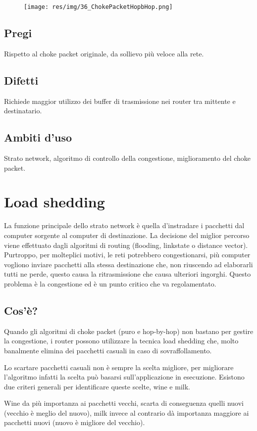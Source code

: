 \begin{figure}[H]
\centering
\texttt{[image: res/img/36\_ChokePacketHopbHop.png]}
\end{figure}
 
\subsection{Pregi}
Rispetto al choke packet originale, da sollievo più veloce alla rete.
\subsection{Difetti}
Richiede maggior utilizzo dei buffer di trasmissione nei router tra mittente e destinatario.
\subsection{Ambiti d'uso}
Strato network, algoritmo di controllo della congestione, miglioramento del choke packet.

\section{Load shedding}
La funzione principale dello strato network è quella d'instradare i pacchetti dal computer sorgente al computer di destinazione. La decisione del miglior percorso viene effettuato dagli algoritmi di routing (flooding, linkstate o distance vector). Purtroppo, per molteplici motivi, le reti potrebbero congestionarsi, più computer vogliono inviare pacchetti alla stessa destinazione che, non riuscendo ad elaborarli tutti ne perde, questo causa la ritrasmissione che causa ulteriori ingorghi. Questo problema è la congestione ed è un punto critico che va regolamentato.
\subsection{Cos'è?}
Quando gli algoritmi di choke packet (puro e hop-by-hop) non bastano per gestire la congestione, i router possono utilizzare la tecnica load shedding che, molto banalmente elimina dei pacchetti casuali in caso di sovraffollamento.

Lo scartare pacchetti casuali non è sempre la scelta migliore, per migliorare l'algoritmo infatti la scelta può basarsi sull'applicazione in esecuzione. Esistono due criteri generali per identificare queste scelte, wine e milk.

Wine da più importanza ai pacchetti vecchi, scarta di conseguenza quelli nuovi (vecchio è meglio del nuovo), milk invece al contrario dà importanza maggiore ai pacchetti nuovi (nuovo è migliore del vecchio).

